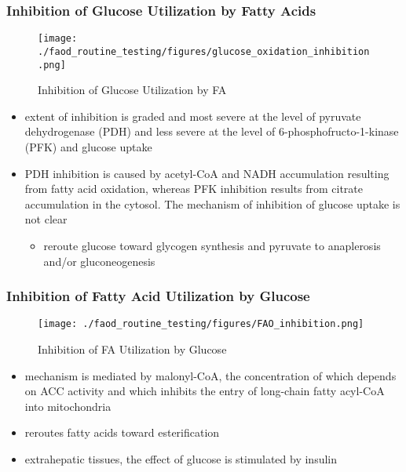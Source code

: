 \documentclass{scrartcl}
\begin{document}
\subsubsection{Inhibition of Glucose Utilization by Fatty Acids}
\label{sec:orgc285147}
\begin{figure}[htbp]
\centering
\texttt{[image: ./faod\_routine\_testing/figures/glucose\_oxidation\_inhibition.png]}
\caption{\label{fig:orgfe61cf8}
Inhibition of Glucose Utilization by FA}
\end{figure}

\begin{itemize}
\item extent of inhibition is graded and most severe at the level of
pyruvate dehydrogenase (PDH) and less severe at the level of
6-phosphofructo-1-kinase (PFK) and glucose uptake
\item PDH inhibition is caused by acetyl-CoA and NADH accumulation
resulting from fatty acid oxidation, whereas PFK inhibition results
from citrate accumulation in the cytosol. The mechanism of
inhibition of glucose uptake is not clear
\begin{itemize}
\item reroute glucose toward glycogen synthesis and pyruvate
to anaplerosis and/or gluconeogenesis
\end{itemize}
\end{itemize}

\subsubsection{Inhibition of Fatty Acid Utilization by Glucose}
\label{sec:orgfd958df}

\begin{figure}[htbp]
\centering
\texttt{[image: ./faod\_routine\_testing/figures/FAO\_inhibition.png]}
\caption{\label{fig:org3a21bef}
Inhibition of FA Utilization by Glucose}
\end{figure}

\begin{itemize}
\item mechanism is mediated by malonyl-CoA, the concentration of which
depends on ACC activity and which inhibits the entry of long-chain
fatty acyl-CoA into mitochondria
\item reroutes fatty acids toward esterification
\item extrahepatic tissues, the effect of glucose is stimulated by
insulin
\end{itemize}
\end{document}
